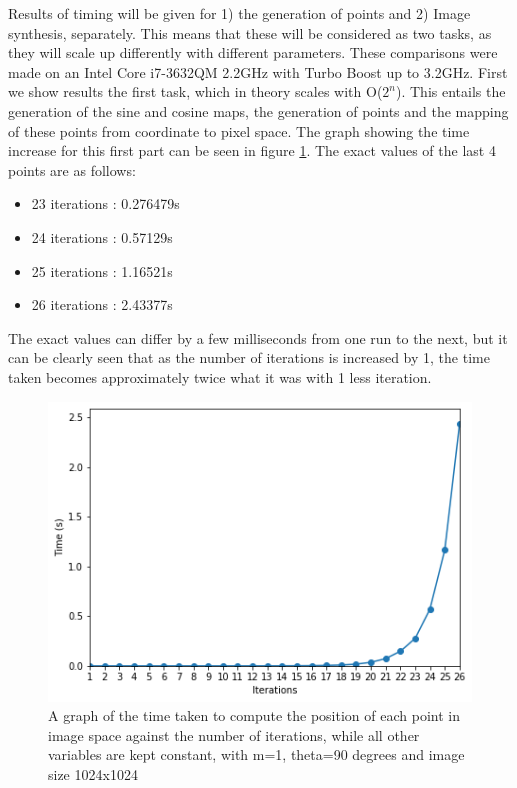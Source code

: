 Results of timing will be given for 1) the generation of points and 2) Image synthesis, separately. This means that these will be considered as two tasks, as they will scale up differently with different parameters. These comparisons were made on an Intel Core i7-3632QM 2.2GHz with Turbo Boost up to 3.2GHz. First we show results the first task, which in theory scales with O($2^n$). This entails the generation of the sine and cosine maps, the generation of points and the mapping of these points from coordinate to pixel space. The graph showing the time increase for this first part can be seen in figure \ref{fig:iterVStime}. The exact values of the last 4 points are as follows:
\begin{itemize}
	\item 23 iterations : 0.276479s
	\item 24 iterations : 0.57129s
	\item 25 iterations : 1.16521s
	\item 26 iterations : 2.43377s
\end{itemize}
The exact values can differ by a few milliseconds from one run to the next, but it can be clearly seen that as the number of iterations is increased by 1, the time taken becomes approximately twice what it was with 1 less iteration.

\begin{figure}
	\includegraphics[width=\linewidth]{Images/iterationsVStime.png}
	\centering
	\caption{A graph of the time taken to compute the position of each point in image space against the number of iterations, while all other variables are kept constant, with m=1, theta=90 degrees and image size 1024x1024}
	\label{fig:iterVStime}
\end{figure}

